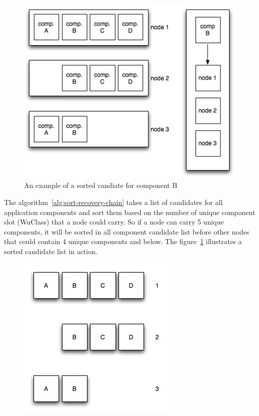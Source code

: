 \begin{figure}[h!]
\caption{An example of a sorted candiate for component B}
\label{fig:sorted-candidate}
\centering
    \includegraphics[width=\linewidth]{figures/sorted-candidate}
\end{figure}

The algorithm~\ref{alg:sort-recovery-chain} takes a list of candidates for
all application components and sort them based on the number of unique
component slot (WuClass) that a node could carry. So if a node can carry
5 unique components, it will be sorted in all component candidate list before
other nodes that could contain 4 unique components and below. The
figure~\ref{fig:sorted-candidate} illustrates a sorted candidate list in action.

\begin{figure}[h!]
\caption{}
\label{fig:proof-one}
\centering
    \includegraphics[width=\linewidth]{figures/proof-one}
\end{figure}

